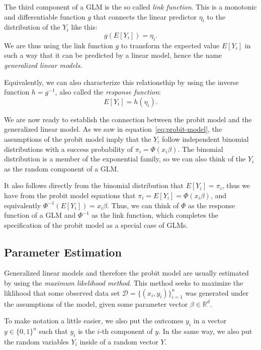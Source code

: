 The third component of a GLM is the so called \textit{link function}.
This is a monotonic and differentiable function
$g$
that connects the linear predictor $\eta_i$ to the distribution of the
$Y_i$ like this:
\begin{equation*}
    g(E[Y_i]) = \eta_i.
\end{equation*}
We are thus using the link function $g$ to transform the expected value
$E[Y_i]$ in such a way that it can be predicted by a linear model,
hence the name \textit{generalized linear models}.

Equivalently, we can also characterize this relationsthip by using
the inverse function $h = g^{-1}$,
also called the \textit{response function}:
\begin{equation*}
    E[Y_i] = h(\eta_i).
\end{equation*}

We are now ready to establish the connection between the probit model and
the generalized linear model.
As we saw in equation~\ref{eq:probit-model}, the assumptions of the
probit model imply that the $Y_i$ follow independent binomial distributions
with a success probability of $\pi_i = \Phi(x_i \beta)$.
The binomial distribution is a member of the exponential family, so
we can also think of the $Y_i$ as the random component of a GLM.

It also follows directly from the binomial distribution that
$E[Y_i] = \pi_i$, thus we have from the probit model equations that
$\pi_i = E[Y_i] = \Phi(x_i \beta)$, and equivalently
$\Phi^{-1}(E[Y_i]) = x_i \beta$. Thus, we can think of $\Phi$ as the response
function of a GLM and $\Phi^{-1}$ as the link function, which completes
the specification of the probit model as a special case of GLMs.

\subsection{Parameter Estimation}
\label{sec:parameter-estimation}

Generalized linear models and therefore the probit model are usually
estimated by using the \textit{maximum likelihood method}.
This method seeks to maximize the liklihood that some observed
data set $\mathcal{D} = \{(x_i, y_i)\}_{i=1}^n$ was generated under the
assumptions of the model, given some parameter vector
$\beta \in \mathbb{R}^d$.

To make notation a little easier, we also put the outcomes $y_i$
in a vector $y \in \{0, 1\}^n$ such that $y_i$ is the $i$-th
component of $y$. In the same way, we also put the random
variables $Y_i$ inside of a random vector $Y$.

